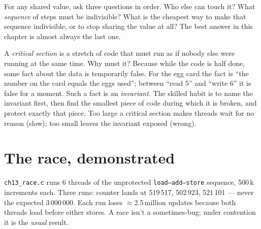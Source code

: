 \begin{principle}
For any shared value, ask three questions in order. Who else can touch
it? What \emph{sequence} of steps must be indivisible? What is the
cheapest way to make that sequence indivisible, or to stop sharing the
value at all? The best answer in this chapter is almost always the
last one.
\end{principle}

\begin{principle}
A \emph{critical section} is a stretch of code that must run as if
nobody else were running at the same time. Why must it? Because
while the code is half done, some fact about the data is
temporarily false. For the egg card the fact is ``the number on the
card equals the eggs used''; between ``read 5'' and ``write 6'' it is
false for a moment. Such a fact is an \emph{invariant}. The skilled
habit is to name the invariant first, then find the smallest piece of
code during which it is broken, and protect exactly that piece. Too
large a critical section makes threads wait for no reason (slow);
too small leaves the invariant exposed (wrong).
\end{principle}

\section{The race, demonstrated}
\label{sec:race13}



\begin{example}
\texttt{ch13\_race.c} runs 6 threads of the unprotected
\texttt{load--add--store} sequence, 500\,k increments each. Three
runs: counter lands at 519\,517, 502\,923, 521\,101 --- never the
expected 3\,000\,000. Each run loses $\approx$2.5\,million updates
because both threads load before either stores. A race isn't a
sometimes-bug; under contention it is the \emph{usual} result.
\end{example}

